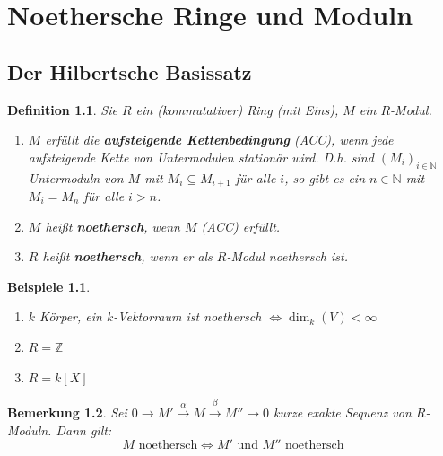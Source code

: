 \documentclass[a4paper,12pt]{scrbook}
\theoremstyle{break}
\newtheorem{Def}{Definition}[chapter]
\newtheorem{Bem}[Def]{Bemerkung}
\theoremstyle{nonumberbreak}
\newtheorem{nnBsp}{Beispiele}
\theoremstyle{nonumberplain}
\newcommand{\emp}[1]{\textbf{\emph{#1}}}
\begin{document}
\chapter{Noethersche Ringe und Moduln}

\section{Der Hilbertsche Basissatz}

\begin{Def}
  Sie $R$ ein (kommutativer) Ring (mit Eins), $M$ ein $R$-Modul.
  \begin{enumerate}
    \item $M$ erfüllt die \emp{aufsteigende Kettenbedingung} (ACC), wenn jede
          aufsteigende Kette von Untermodulen stationär wird. D.h. sind
          $(M_i)_{i \in \mathbb{N}}$ Untermoduln von $M$ mit $M_i \subseteq 
          M_{i+1}$ für alle $i$, so gibt es ein $n \in \mathbb{N}$ mit $M_i =
          M_n$ für alle $i > n$.
    \item $M$ heißt \emp{noethersch}, wenn $M$ (ACC) erfüllt.
    \item $R$ heißt \emp{noethersch}, wenn er als $R$-Modul noethersch ist.
\end{enumerate}
\end{Def}

\begin{nnBsp}
  \begin{enumerate}
    \item[1.)] $k$ Körper, ein $k$-Vektorraum ist noethersch $\Leftrightarrow \dim_k(V) < \infty$ 
    \item[2.)] $R = \mathbb{Z}$ 
    \item[3.)] $R = k[X]$  
  \end{enumerate}
\end{nnBsp}

\begin{Bem}
\label{2.2}
  Sei $0 \to M' \overset{\alpha}{\to} M \overset{\beta}{\to} M'' \to 0$ kurze
  exakte Sequenz von $R$-Moduln. Dann gilt:
  \[M \mbox{ noethersch} \Leftrightarrow M' \mbox{ und } M'' \mbox{ noethersch}\]
\end{Bem}
\end{document}
